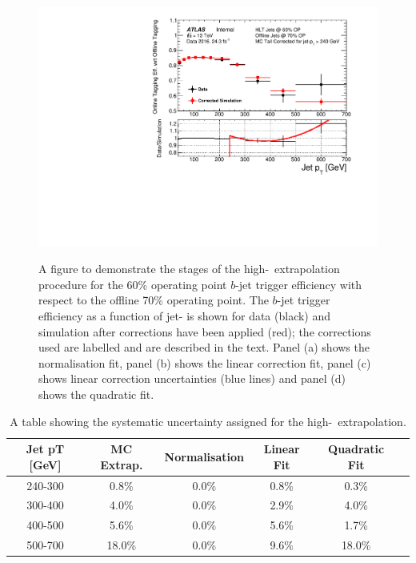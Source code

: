 \begin{figure}[!ht]
\begin{center}
   {\includegraphics[width=0.47\linewidth, angle=0]{figs/Trigger/Full_GRL_bslt2mm_effCorrFitQuad_jetPt.pdf}}
\end{center}
\vspace{-0.8em}
\caption[A figure to demonstrate the stages of the high-\pT~extrapolation procedure for the $b$-jet trigger efficiency measurement.]
        {A figure to demonstrate the stages of the high-\pT~extrapolation procedure for the 60\% operating point $b$-jet trigger efficiency with respect to the offline 70\% operating point.
          The $b$-jet trigger efficiency as a function of jet-\pT{} is shown for data (black) and simulation after corrections have been applied (red);
          the corrections used are labelled and are described in the text.
          Panel (a) shows the normalisation fit,
          panel (b) shows the linear correction fit,
          panel (c) shows linear correction uncertainties (blue lines) and
          panel (d) shows the quadratic fit.
        }
        \label{fig:bTrig_mcExtrap}
\end{figure}

\begin{table}[!ht]
  \begin{center}
\begin{tabular}{|c||c||c|c|c|c|}
  \hline
  Jet pT [GeV] & MC Extrap. & Normalisation & Linear Fit  & Quadratic Fit \\
  \hline
  240-300 &  0.8\% & 0.0\% & 0.8\% &  0.3\% \\
  300-400 &  4.0\% & 0.0\% & 2.9\% &  4.0\% \\
  400-500 &  5.6\% & 0.0\% & 5.6\% &  1.7\% \\
  500-700 & 18.0\% & 0.0\% & 9.6\% & 18.0\% \\
  \hline
\end{tabular}
\caption{A table showing the systematic uncertainty assigned for the high-\pT~extrapolation.}
\label{tab:bTrig_extrapSyst}
\vspace{-1em}
  \end{center}
\end{table}

